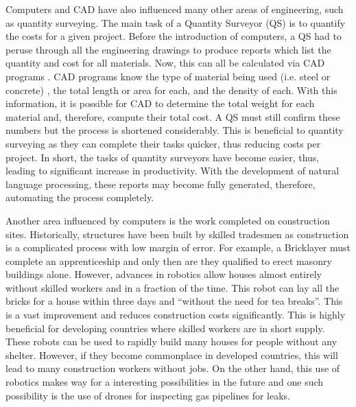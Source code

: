 \documentclass[11pt]{article} %
\begin{document}
Computers and CAD have also influenced many other areas of engineering, such as quantity surveying. The main task of a Quantity Surveyor (QS) is to quantify the costs for a given project. Before the introduction of computers, a QS had to peruse through all the engineering drawings to produce reports which list the quantity and cost for all materials. Now, this can all be calculated via CAD programs \cite{QSComps}. CAD programs know the type of material being used (i.e. steel or concrete) , the total length or area for each, and the density of each. With this information, it is possible for CAD to determine the total weight for each material and, therefore, compute their total cost.  A QS must still confirm these numbers but the process is shortened considerably. This is beneficial to quantity surveying as they can complete their tasks quicker, thus reducing costs per project. In short, the tasks of quantity surveyors have become easier, thus, leading to significant increase in productivity. With the development of natural language processing, these reports may become fully generated, therefore, automating the process completely.

Another area influenced by computers is the work completed on construction sites. Historically, structures have been built by skilled tradesmen as construction is a complicated process with low margin of error. For example, a Bricklayer must complete an apprenticeship and only then are they qualified to erect masonry buildings alone. However, advances in robotics allow houses almost entirely without skilled workers and in a  fraction of the time\cite{RobotBuilder}. This robot \cite{RobotBuilder} can lay all the bricks for a house within three days and ``without the need for tea breaks''\cite{RobotBuilder}. This is a vast improvement and reduces construction costs significantly. This is highly beneficial for developing countries where skilled workers are in short supply. These robots can be used to rapidly build many houses for people without any shelter. However, if they become commonplace in developed countries, this will lead to many construction workers without jobs. On the other hand, this use of robotics makes way for a interesting possibilities in the future and one such possibility is the use of drones for inspecting gas pipelines for leaks\cite{RobotSurvey2}. 
\end{document}
